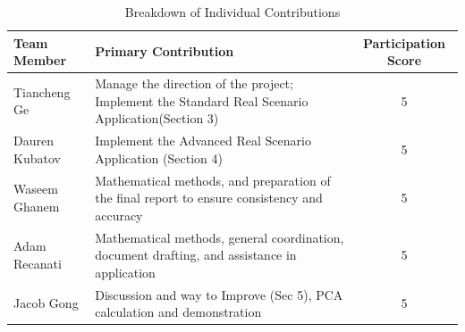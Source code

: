 \documentclass[12pt]{article}
\begin{document}
\begin{table}[H]
    \centering
   
    \begin{tabular}{|l|p{9cm}|c|} 
    \hline
    \textbf{Team Member} & \textbf{Primary Contribution} & \textbf{Participation Score} \\
    \hline
    Tiancheng Ge &Manage the direction of the project; Implement the Standard Real Scenario Application(Section 3) &5 \\ 
    \hline
    Dauren Kubatov &Implement the Advanced Real Scenario Application (Section 4)  &5  \\
    \hline
    Waseem Ghanem & Mathematical methods, and preparation of the final report to ensure consistency and accuracy & 5 \\
    \hline
    Adam Recanati &  Mathematical methods, general coordination, document drafting, and assistance in application &  5\\
    \hline
    Jacob Gong & Discussion and way to Improve (Sec 5), PCA calculation and demonstration &  5\\ 
    \hline
    \end{tabular}
    \caption{Breakdown of Individual Contributions}
    \label{tab:contributions}
\end{table}


\newpage
\end{document}

